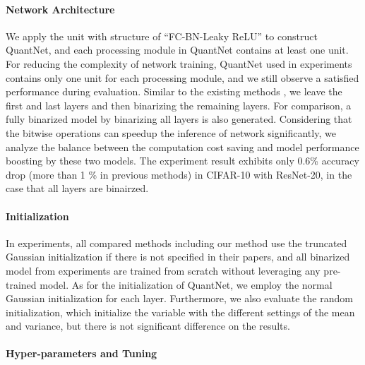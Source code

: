 \documentclass[runningheads]{llncs}
\begin{document}
\paragraph{\textbf{Network Architecture}}
We apply the unit with structure of ``FC-BN-Leaky ReLU'' to construct QuantNet,
and each processing module in QuantNet contains at least one unit.
For reducing the complexity of network training,
QuantNet used in experiments contains only one unit for each processing module,
and we still observe a satisfied performance during evaluation.
Similar to the existing methods \cite{rastegari2016xnor,Zhang2018LQ,Uhlich2019DQ},
we leave the first and last layers and then binarizing the remaining layers.
For comparison, a fully binarized model by binarizing all layers is also generated.
Considering that the bitwise operations can speedup the inference of network significantly,
we analyze the balance between the computation cost saving and model performance boosting by these two models.
The experiment result exhibits only 0.6\% accuracy drop (more than 1 \% in previous methods)
in CIFAR-10 \cite{cifar10} with ResNet-20, in the case that all layers are binairzed.

\paragraph{\textbf{Initialization}}
In experiments, all compared methods including our method
use the truncated Gaussian initialization if there is not specified in their papers,
and all binarized model from experiments are trained from scratch without leveraging any pre-trained model.
As for the initialization of QuantNet, we employ the normal Gaussian initialization for each layer.
Furthermore, we also evaluate the random initialization, which
initialize the variable with the different settings of the mean and variance,
but there is not significant difference on the results.

\paragraph{\textbf{Hyper-parameters and Tuning}}
\end{document}
